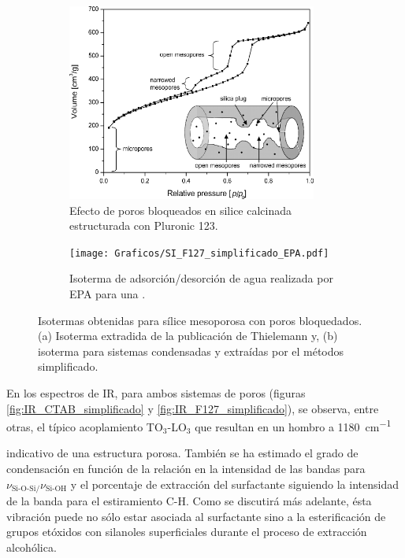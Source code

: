 {			%
			\begin{figure}[th]
		 	   	    \begin{subfigure}[t]{0.49\textwidth}
			       	\includegraphics[width=0.90\textwidth]{Graficos/Doble-distr.png}
			       	\caption{Efecto de poros bloqueados en silice calcinada estructurada con Pluronic 123.}
			       	\label{fig:thielemann}
			   		\end{subfigure}
			   		\begin{subfigure}[t]{0.49\textwidth}
			   	    \texttt{[image: Graficos/SI\_F127\_simplificado\_EPA.pdf]}
			   	    \caption{Isoterma de adsorción/desorción de agua realizada por EPA para una \pdmF.}
			   		\end{subfigure}
					 \caption[Microscopías \pdmF\space tratamiento simplificado.]{Isotermas obtenidas para sílice mesoporosa con poros bloquedados. (a) Isoterma extradida de la publicación de Thielemann\cite{Thielemann2011} y, (b) isoterma para sistemas \pdmF\space condensadas y extraídas por el métodos simplificado.}
					 \label{fig:F127_simplificado_EPA_2}	
				     \end{figure}

			 En los espectros de IR, para ambos sistemas de poros (figuras \ref{fig:IR_CTAB_simplificado} y \ref{fig:IR_F127_simplificado}), se observa, entre otras, el típico acoplamiento TO$_3$-LO$_3$ que resultan en un hombro a \SI{1180}{\cm^{-1}}} indicativo de una estructura porosa\cite{Innocenzi2003}. También se ha estimado el grado de condensación en función de la relación en la intensidad de las bandas para $\nu_{\text{Si-O-Si/}}\nu_{\text{Si-OH}}$ y el porcentaje de extracción del surfactante siguiendo la intensidad de la banda para el estiramiento C-H. Como se discutirá más adelante, ésta vibración puede no sólo estar asociada al surfactante sino a la esterificación de grupos etóxidos con silanoles superficiales durante el proceso de extracción alcohólica.

